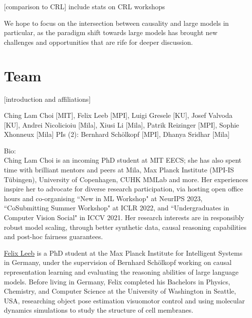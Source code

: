 \documentclass{article}
\begin{document}
[comparison to CRL] include stats on CRL workshops


We hope to focus on the intersection between causality and large models in particular, as the paradigm shift towards large models has brought new challenges and opportunities that are rife for deeper discussion.


% 


\section{Team}

[introduction and affiliations]

Ching Lam Choi [MIT], Felix Leeb [MPI], Luigi Gresele [KU], Josef Valvoda [KU],  Andrei Nicolicioiu [Mila], Xiusi Li [Mila], Patrik Reizinger [MPI], Sophie Xhonneux [Mila]
PIs (2): Bernhard Schölkopf [MPI], Dhanya Sridhar [Mila]

Bio:\\

Ching Lam Choi is an incoming PhD student at MIT EECS; she has also spent time with brilliant mentors and peers at Mila, Max Planck Institute (MPI-IS Tübingen), University of Copenhagen, CUHK MMLab and more. Her experiences inspire her to advocate for diverse research participation, via hosting open office hours and co-organising ``New in ML Workshop" at NeurIPS 2023, ``CoSubmitting Summer Workshop" at ICLR 2022, and ``Undergraduates in Computer Vision Social" in ICCV 2021. Her research interests are in responsibly robust model scaling, through better synthetic data, causal reasoning capabilities and post-hoc fairness guarantees.

\href{https://felixludos.com/}{Felix Leeb} 
is a PhD student at the Max Planck Institute for Intelligent Systems in Germany, under the supervision of Bernhard Schölkopf working on causal representation learning and evaluating the reasoning abilities of large language models. Before living in Germany, Felix completed his Bachelors in Physics, Chemistry, and Computer Science at the University of Washington in Seattle, USA, researching object pose estimation visuomotor control and using molecular dynamics simulations to study the structure of cell membranes.
\end{document}
